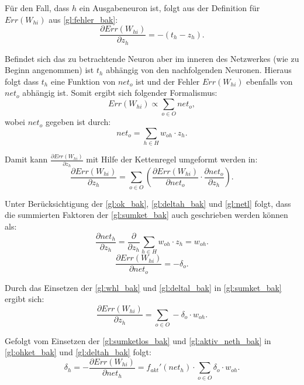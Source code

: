 Für den Fall, dass $h$ ein Ausgabeneuron ist, folgt aus der Definition für $Err(W_{hi})$ aus \autoref{gl:fehler_bak}:
\begin{equation}
\frac{\partial Err(W_{hi})}{\partial z_{h}} = -(t_h - z_h).
\end{equation}

Befindet sich das zu betrachtende Neuron aber im inneren des Netzwerkes (wie zu Beginn angenommen) ist $t_h$ abhängig von den nachfolgenden Neuronen. Hieraus folgt dass $t_h$ eine Funktion von $net_o$ ist und der Fehler $Err(W_{hi})$ ebenfalls von $net_o$ abhängig ist. Somit ergibt sich folgender Formalismus:
\begin{equation*}
Err(W_{hi}) \propto \sum\limits_{o \in O} net_o,
\end{equation*}
wobei $net_o$ gegeben ist durch:
\begin{equation}
net_{o} = \sum_{h \in H} w_{oh} \cdot z_{h} .
\label{gl:netl}
\end{equation}

Damit kann $\frac{\partial Err(W_{hi})}{\partial z_{h}}$ mit Hilfe der Kettenregel umgeformt werden in:
\begin{equation}
\frac{\partial Err(W_{hi})}{\partial z_{h}} =\sum\limits_{o \in O} \left (  \frac{\partial Err(W_{hi})}{\partial net_{o}} \cdot \frac{\partial net_{o}}{\partial z_{h}} \right ).
\label{gl:sumket_bak}
\end{equation}

Unter Berücksichtigung der \autoref{gl:ok_bak}, \autoref{gl:deltah_bak} und \autoref{gl:netl} folgt, dass die summierten Faktoren der \autoref{gl:sumket_bak} auch geschrieben werden können als:
\begin{equation}
\frac{\partial net_{h}}{\partial z_{h}} = \frac{\partial }{\partial z_{h}} \sum\limits_{h \in H} w_{oh} \cdot z_{h} = w_{oh} .
\label{gl:whl_bak}
\end{equation}
\begin{equation}
\frac{\partial Err(W_{hi})}{\partial net_{o}} = -\delta_o .
\label{gl:deltal_bak}
\end{equation}

Durch das Einsetzen der \autoref{gl:whl_bak} und \autoref{gl:deltal_bak} in \autoref{gl:sumket_bak} ergibt sich:
\begin{equation}
\frac{\partial Err(W_{hi})}{\partial z_{h}} =\sum\limits_{o \in O}  -\delta_o \cdot w_{oh} .
\label{gl:sumketlos_bak}
\end{equation}

Gefolgt vom Einsetzen der \autoref{gl:sumketlos_bak} und \autoref{gl:aktiv_neth_bak} in \autoref{gl:ohket_bak} und \autoref{gl:deltah_bak} folgt:
\begin{equation}
\delta_{h}= -\frac{\partial Err(W_{hi})}{\partial net_{h}} = f_{akt}'(net_h) \cdot \sum\limits_{o \in O}  \delta_o \cdot w_{oh}.
\label{gl:deltahinnen_bak}
\end{equation}

